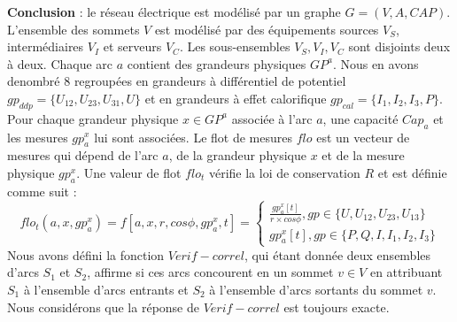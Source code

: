 \newline 

{\bf Conclusion} :
le r\'eseau \'electrique est mod\'elis\'e par un graphe $G=(V,A,CAP)$.
L'ensemble des sommets $V$ est mod\'elis\'e par des \'equipements sources $V_S$, interm\'ediaires $V_I$ et serveurs $V_C$. Les sous-ensembles  $V_S, V_I, V_C$ sont disjoints deux \`a deux.
Chaque arc $a$ contient des grandeurs physiques $GP^{a}$. Nous en avons denombr\'e $8$ regroup\'ees en 
grandeurs \`a diff\'erentiel de potentiel $gp_{ddp} = \{U_{12}, U_{23},U_{31},U \}$ et en 
grandeurs \`a effet calorifique  $gp_{cal} = \{I_{1}, I_{2}, I_{3}, P \}$.
 Pour chaque grandeur physique $x \in GP^{a}$ associ\'ee \`a l'arc $a$, une capacit\'e $Cap_{a}$ et les mesures $gp_{a}^{x}$ lui sont associ\'ees.
Le flot de mesures $flo$ est un vecteur de mesures qui d\'epend de l'arc $a$, de la grandeur physique $x$ et de la mesure physique $gp_{a}^{x}$. Une valeur de flot $flo_t$  v\'erifie la loi de conservation $R$ et est d\'efinie comme suit :
\begin{equation}
	flo_{t}(a, x, gp_{a}^{x}) = f[a, x, r, cos \phi, gp_{a}^{x}, t] =
	\begin{cases}
		 \frac{  gp_{a}^{x}[t] }{r \times cos \phi}, gp \in \{U, U_{12}, U_{23}, U_{13}  \} \\
		 gp_{a}^{x}[t] , gp \in \{P, Q, I, I_{1}, I_{2}, I_{3}  \}
	\end{cases}
\end{equation}
\newline
Nous avons d\'efini la fonction $Verif-correl$, qui \'etant donn\'ee deux ensembles d'arcs $S_1$ et $S_2$, affirme si ces arcs concourent en un sommet $v \in V$ en attribuant  $S_1$ \`a l'ensemble d'arcs entrants et $S_2$ \`a l'ensemble d'arcs sortants du sommet $v$.
Nous consid\'erons que la r\'eponse de $Verif-correl$ est toujours exacte.  